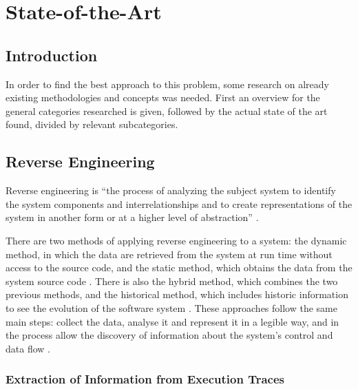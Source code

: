 \chapter{State-of-the-Art} \label{chap:sota}

\section*{}

\section{Introduction}
In order to find the best approach to this problem, some research on already existing methodologies and concepts was needed. First an overview for the general categories researched is given, followed by the actual state of the art found, divided by relevant subcategories. 

\section{Reverse Engineering}\label{sec:reverseengineering}

Reverse engineering is “the process of analyzing the subject system to identify the system components and interrelationships and to create representations of the system in another form or at a higher level of abstraction” \cite{chikofsky1990reverse}.

There are two methods of applying reverse engineering to a system: the dynamic method, in which the data are retrieved from the system at run time without access to the source code, and the static method, which obtains the data from the system source code \cite{systa1999dynamic}. There is also the hybrid method, which combines the two previous methods, and the historical method, which includes historic information to see the evolution of the software system \cite{canfora2011achievements}. These approaches follow the same main steps: collect the data, analyse it and represent it in a legible way, and in the process allow the discovery of information about the system's control and data flow \cite{pacione2003comparative}.

\subsection{Extraction of Information from Execution Traces} \label{sec:extractexecutiontraces}

